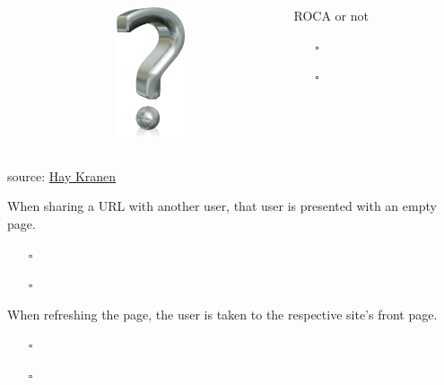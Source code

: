 \documentclass{beamer}
\begin{document}
\begin{frame}{\insertsectionhead}
  \vspace*{0.5in}

  \begin{columns}
    \begin{column}{2.2cm}
    \end{column}

    \begin{column}{2.2cm}
      \includegraphics[width=2cm]{images/quiz.png}
    \end{column}

    \begin{column}{6.6cm}
      ROCA or not
      \vspace{0.3cm}
      \begin{itemize}
        \item[$\square$] 
        \item[$\square$] 
      \end{itemize}
    \end{column}
  \end{columns}

  \vspace*{0.4in}
  \tiny source: \href{http://commons.wikimedia.org/wiki/File:Question_mark_3d.png}{Hay Kranen}
\end{frame}

\begin{frame}
  When sharing a URL with another user, that user is presented with an empty page.

  \vspace{0.3cm}
  \begin{itemize}
    \item[$\square$] 
    \item[$\square$] 
  \end{itemize}

\end{frame}

\begin{frame}
  When refreshing the page, the user is taken to the respective site's front
  page.

  \vspace{0.3cm}
  \begin{itemize}
    \item[$\square$] 
    \item[$\square$] 
  \end{itemize}

\end{frame}
\end{document}
